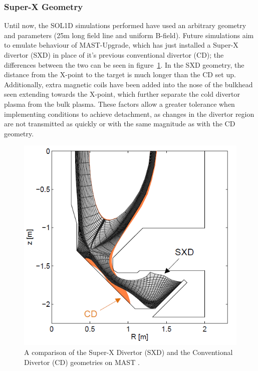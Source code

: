 \documentclass[11pt]{article}  %
\begin{document}
\subsubsection{Super-X Geometry}\label{sssecSXG}
Until now, the SOL1D simulations performed have used an arbitrary geometry and parameters (25m long field line and uniform B-field). Future simulations aim to emulate behaviour of MAST-Upgrade, which has just installed a Super-X divertor (SXD) in place of it's previous conventional divertor (CD); the differences between the two can be seen in figure~\ref{figCDvsSXD}. In the SXD geometry, the distance from the X-point to the target is much longer than the CD set up. Additionally, extra magnetic coils have been added into the nose of the bulkhead seen extending towards the X-point, which further separate the cold divertor plasma from the bulk plasma. These factors allow a greater tolerance when implementing conditions to achieve detachment, as changes in the divertor region are not transmitted as quickly or with the same magnitude as with the CD geometry.

\begin{figure}
\includegraphics[scale=0.5]{Figures/CDvsSXD.png}
\centering
\caption{A comparison of the Super-X Divertor (SXD) and the Conventional Divertor (CD) geometries on MAST \cite{Havlickova2014}.}\label{figCDvsSXD}
\end{figure}
\end{document}
